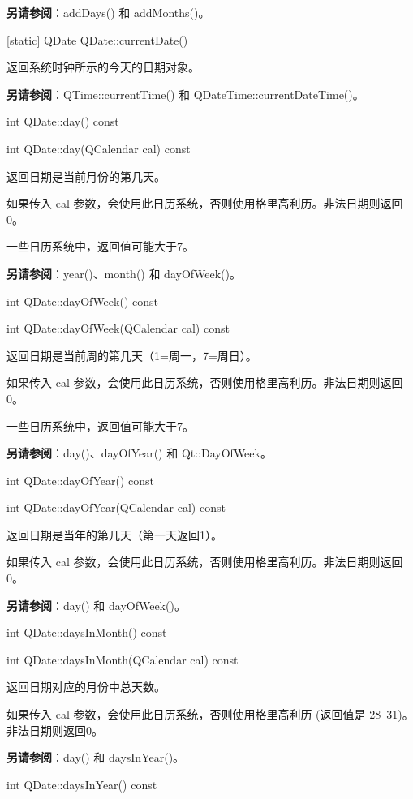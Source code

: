 \textbf{另请参阅}：addDays() 和 addMonths()。

\splitLine

[static] QDate QDate::currentDate()

返回系统时钟所示的今天的日期对象。

\textbf{另请参阅}：QTime::currentTime() 和 QDateTime::currentDateTime()。

\splitLine

int QDate::day() const

int QDate::day(QCalendar cal) const

返回日期是当前月份的第几天。

如果传入 cal 参数，会使用此日历系统，否则使用格里高利历。非法日期则返回0。

一些日历系统中，返回值可能大于7。

\textbf{另请参阅}：year()、month() 和 dayOfWeek()。

\splitLine

int QDate::dayOfWeek() const

int QDate::dayOfWeek(QCalendar cal) const

返回日期是当前周的第几天（1=周一，7=周日）。

如果传入 cal 参数，会使用此日历系统，否则使用格里高利历。非法日期则返回0。

一些日历系统中，返回值可能大于7。

\textbf{另请参阅}：day()、dayOfYear() 和 Qt::DayOfWeek。

\splitLine

int QDate::dayOfYear() const

int QDate::dayOfYear(QCalendar cal) const

返回日期是当年的第几天（第一天返回1）。

如果传入 cal 参数，会使用此日历系统，否则使用格里高利历。非法日期则返回0。

\textbf{另请参阅}：day() 和 dayOfWeek()。

\splitLine

int QDate::daysInMonth() const

int QDate::daysInMonth(QCalendar cal) const

返回日期对应的月份中总天数。

如果传入 cal 参数，会使用此日历系统，否则使用格里高利历 (返回值是 28~31)。非法日期则返回0。

\textbf{另请参阅}：day() 和 daysInYear()。

\splitLine

int QDate::daysInYear() const

